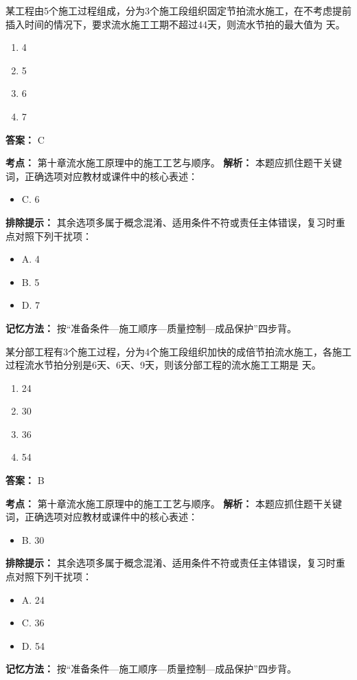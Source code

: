 \documentclass[UTF8,fontset=fandol,11pt]{ctexart}
\begin{document}
\begin{quizbox}[title={第 12 题}]
某工程由5个施工过程组成，分为3个施工段组织固定节拍流水施工，在不考虑提前插入时间的情况下，要求流水施工工期不超过44天，则流水节拍的最大值为 天。\\
\begin{enumerate}[label=\Alph*.]
\item 4
\item 5
\item 6
\item 7
\end{enumerate}
\textbf{答案：} C
\vspace{0.25em}
\begin{answerbox}[title={考点解析}]
\textbf{考点：} 第十章流水施工原理中的施工工艺与顺序。
\textbf{解析：} 本题应抓住题干关键词，正确选项对应教材或课件中的核心表述：
\begin{itemize}
\item C. 6
\end{itemize}
\textbf{排除提示：} 其余选项多属于概念混淆、适用条件不符或责任主体错误，复习时重点对照下列干扰项：
\begin{itemize}
\item A. 4
\item B. 5
\item D. 7
\end{itemize}
\textbf{记忆方法：} 按“准备条件—施工顺序—质量控制—成品保护”四步背。
\end{answerbox}
\end{quizbox}

\vspace{0.2em}

\begin{quizbox}[title={第 13 题}]
某分部工程有3个施工过程，分为4个施工段组织加快的成倍节拍流水施工，各施工过程流水节拍分别是6天、6天、9天，则该分部工程的流水施工工期是 天。\\
\begin{enumerate}[label=\Alph*.]
\item 24
\item 30
\item 36
\item 54
\end{enumerate}
\textbf{答案：} B
\vspace{0.25em}
\begin{answerbox}[title={考点解析}]
\textbf{考点：} 第十章流水施工原理中的施工工艺与顺序。
\textbf{解析：} 本题应抓住题干关键词，正确选项对应教材或课件中的核心表述：
\begin{itemize}
\item B. 30
\end{itemize}
\textbf{排除提示：} 其余选项多属于概念混淆、适用条件不符或责任主体错误，复习时重点对照下列干扰项：
\begin{itemize}
\item A. 24
\item C. 36
\item D. 54
\end{itemize}
\textbf{记忆方法：} 按“准备条件—施工顺序—质量控制—成品保护”四步背。
\end{answerbox}
\end{quizbox}
\end{document}
